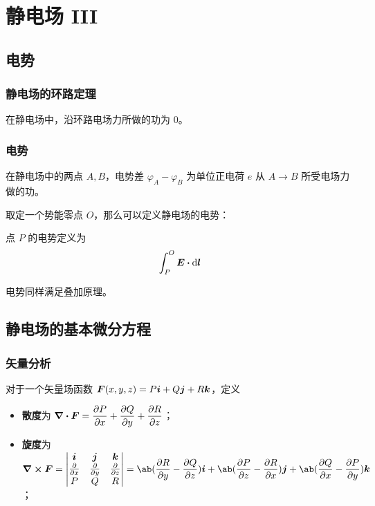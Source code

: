 \section{静电场 III}

\subsection{电势}

\subsubsection{静电场的环路定理}

\begin{theorem}
	在静电场中，沿环路电场力所做的功为 $0$。
\end{theorem}

\subsubsection{电势}

在静电场中的两点 $A, B$，电势差 $\varphi_A - \varphi_B$ 为单位正电荷 $e$ 从 $A \to B$ 所受电场力做的功。

取定一个势能零点 $O$，那么可以定义静电场的电势：

\begin{definition}[电势]
	点 $P$ 的电势定义为
	$$
	\int_P^{O} \vect{E} \vdot \dd{\vect{l}}
	$$
\end{definition}

电势同样满足叠加原理。

\subsection{静电场的基本微分方程}

\subsubsection{矢量分析}

\begin{definition}[散度和旋度]
	对于一个矢量场函数 $\boldsymbol{F}(x, y, z) = P \boldsymbol{i} + Q \boldsymbol{j} + R \boldsymbol{k}$，定义
	\begin{itemize}
		\item \textbf{散度}为 $\displaystyle \div \boldsymbol{F} = \pdv{P}{x} + \pdv{Q}{y} + \pdv{R}{z}$；
		\item \textbf{旋度}为 $\displaystyle \curl \vect{F} = \begin{vmatrix}
			\vect{i} & \vect{j} & \vect{k} \\
			\pdv{x} & \pdv{y} & \pdv{z} \\
			P & Q & R 
		\end{vmatrix} = \ab(\pdv{R}{y} - \pdv{Q}{z}) \vect{i} + \ab(\pdv{P}{z} - \pdv{R}{x}) \vect{j} + \ab(\pdv{Q}{x} - \pdv{P}{y}) \vect{k}
		$；
	\end{itemize}
\end{definition}


